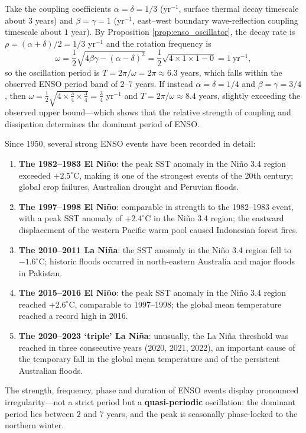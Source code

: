 \begin{example}\label{ex:enso_period_calc}
Take the coupling coefficients $\alpha = \delta = 1/3$ (yr$^{-1}$, surface thermal decay timescale about $3$ years) and $\beta = \gamma = 1$ (yr$^{-1}$, east--west boundary wave-reflection coupling timescale about $1$ year). By Proposition \ref{prop:enso_oscillator}, the decay rate is $\rho = (\alpha+\delta)/2 = 1/3$ yr$^{-1}$ and the rotation frequency is
\[
\omega = \frac{1}{2}\sqrt{4\beta\gamma - (\alpha-\delta)^2} = \frac{1}{2}\sqrt{4 \times 1 \times 1 - 0} = 1\ \text{yr}^{-1},
\]
so the oscillation period is $T = 2\pi/\omega = 2\pi \approx 6.3$ years, which falls within the observed ENSO period band of $2$--$7$ years. If instead $\alpha = \delta = 1/4$ and $\beta = \gamma = 3/4$, then $\omega = \tfrac12\sqrt{4 \times \tfrac34 \times \tfrac34} = \tfrac34$ yr$^{-1}$ and $T = 2\pi/\omega \approx 8.4$ years, slightly exceeding the observed upper bound---which shows that the relative strength of coupling and dissipation determines the dominant period of ENSO.
\end{example}

\begin{example}\label{ex:enso_events}
Since 1950, several strong ENSO events have been recorded in detail:
\begin{enumerate}[label=(\roman*)]
    \item \textbf{The 1982--1983 El Niño}: the peak SST anomaly in the Niño 3.4 region exceeded $+2.5^\circ$C, making it one of the strongest events of the 20th century; global crop failures, Australian drought and Peruvian floods.
    \item \textbf{The 1997--1998 El Niño}: comparable in strength to the 1982--1983 event, with a peak SST anomaly of $+2.4^\circ$C in the Niño 3.4 region; the eastward displacement of the western Pacific warm pool caused Indonesian forest fires.
    \item \textbf{The 2010--2011 La Niña}: the SST anomaly in the Niño 3.4 region fell to $-1.6^\circ$C; historic floods occurred in north-eastern Australia and major floods in Pakistan.
    \item \textbf{The 2015--2016 El Niño}: the peak SST anomaly in the Niño 3.4 region reached $+2.6^\circ$C, comparable to 1997--1998; the global mean temperature reached a record high in 2016.
    \item \textbf{The 2020--2023 `triple' La Niña}: unusually, the La Niña threshold was reached in three consecutive years (2020, 2021, 2022), an important cause of the temporary fall in the global mean temperature and of the persistent Australian floods.
\end{enumerate}
The strength, frequency, phase and duration of ENSO events display pronounced irregularity---not a strict period but a \textbf{quasi-periodic} oscillation: the dominant period lies between $2$ and $7$ years, and the peak is seasonally phase-locked to the northern winter.
\end{example}

